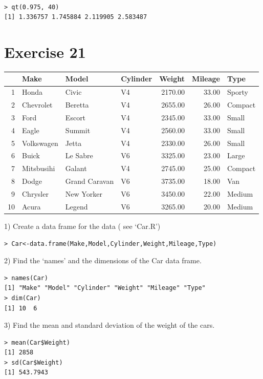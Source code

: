 \documentclass{article}
\begin{document}
\begin{verbatim}

> qt(0.975, 40)
[1] 1.336757 1.745884 2.119905 2.583487
\end{verbatim}
\section*{Exercise 21}

\begin{table}[ht]
\begin{center}
\begin{tabular}{rlllrrl}
  \hline
 & Make & Model & Cylinder & Weight & Mileage & Type \\
  \hline
1 & Honda & Civic & V4 & 2170.00 & 33.00 & Sporty \\
  2 & Chevrolet & Beretta & V4 & 2655.00 & 26.00 & Compact \\
  3 & Ford & Escort & V4 & 2345.00 & 33.00 & Small \\
  4 & Eagle & Summit & V4 & 2560.00 & 33.00 & Small \\
  5 & Volkswagen & Jetta & V4 & 2330.00 & 26.00 & Small \\
  6 & Buick & Le Sabre & V6 & 3325.00 & 23.00 & Large \\
  7 & Mitsbusihi & Galant & V4 & 2745.00 & 25.00 & Compact \\
  8 & Dodge & Grand Caravan & V6 & 3735.00 & 18.00 & Van \\
  9 & Chrysler & New Yorker & V6 & 3450.00 & 22.00 & Medium \\
  10 & Acura & Legend & V6 & 3265.00 & 20.00 & Medium \\
   \hline
\end{tabular}
\end{center}
\end{table}



1) Create a data frame for the data ( see `Car.R')
\begin{verbatim}
> Car<-data.frame(Make,Model,Cylinder,Weight,Mileage,Type)
\end{verbatim}

2) Find the `names' and the dimensions of the Car data frame.
\begin{verbatim}
> names(Car)
[1] "Make" "Model" "Cylinder" "Weight" "Mileage" "Type"
> dim(Car)
[1] 10  6
\end{verbatim}

3) Find the mean and standard deviation of the weight of the cars.
\begin{verbatim}
> mean(Car$Weight)
[1] 2858
> sd(Car$Weight)
[1] 543.7943
\end{verbatim}
\end{document}
